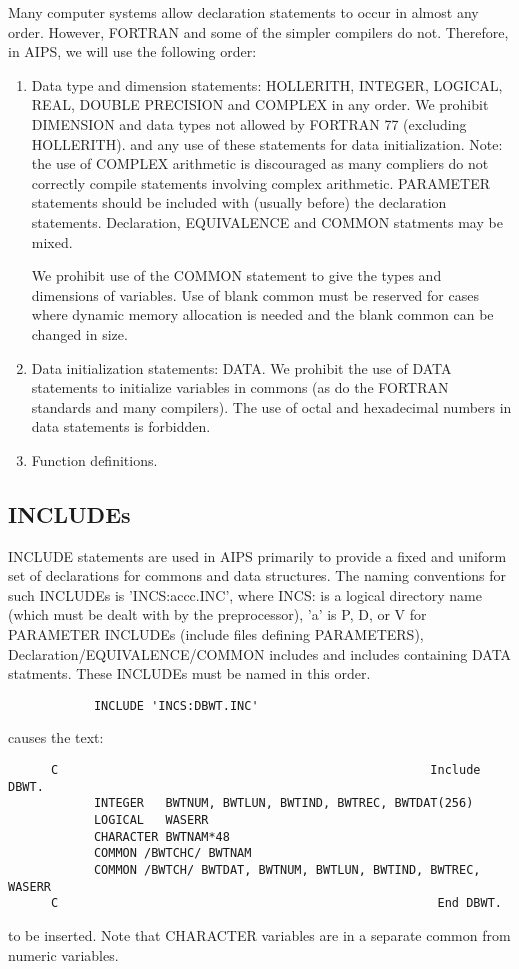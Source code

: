 Many computer systems allow declaration statements to occur in almost
any order.  However, FORTRAN and some of the simpler compilers do not.
Therefore, in AIPS, we will use the following order:
\begin{enumerate} %
\item Data type and dimension statements: HOLLERITH, INTEGER,
LOGICAL, REAL, DOUBLE PRECISION and COMPLEX in any order.  We prohibit
DIMENSION and data types not allowed by FORTRAN 77 (excluding
HOLLERITH).  and any use of these statements for data initialization.
Note: the use of COMPLEX arithmetic is discouraged as many compliers
do not correctly compile statements involving complex arithmetic.
PARAMETER statements should be included with (usually before) the
declaration statements.  Declaration, EQUIVALENCE and COMMON statments
may be mixed.

We prohibit use of the COMMON statement to give the types and
dimensions of variables. Use of blank common must be reserved for
cases where dynamic memory allocation is needed and the blank common
can be changed in size.

\item Data initialization statements: DATA.  We prohibit the use of DATA
statements to initialize variables in commons (as do the FORTRAN
standards and many compilers). The use of octal and hexadecimal
numbers in data statements is forbidden.

\item Function definitions.

\end{enumerate} %

\subsection{INCLUDEs}
INCLUDE statements are used in AIPS primarily to provide a fixed and
uniform set of declarations for commons and data structures. The
naming conventions for such INCLUDEs is 'INCS:accc.INC', where INCS:
is a logical directory name (which must be dealt with by the
preprocessor), 'a' is P, D, or V for PARAMETER INCLUDEs (include files
defining PARAMETERS), Declaration/EQUIVALENCE/COMMON includes and
includes containing DATA statments.  These INCLUDEs must be named in
this order.

\begin{verbatim}
            INCLUDE 'INCS:DBWT.INC'
\end{verbatim}
causes the text:
\begin{verbatim}
      C                                                    Include DBWT.
            INTEGER   BWTNUM, BWTLUN, BWTIND, BWTREC, BWTDAT(256)
            LOGICAL   WASERR
            CHARACTER BWTNAM*48
            COMMON /BWTCHC/ BWTNAM
            COMMON /BWTCH/ BWTDAT, BWTNUM, BWTLUN, BWTIND, BWTREC, WASERR
      C                                                     End DBWT.

\end{verbatim}
to be inserted.  Note that CHARACTER variables are in a separate
common from numeric variables.

